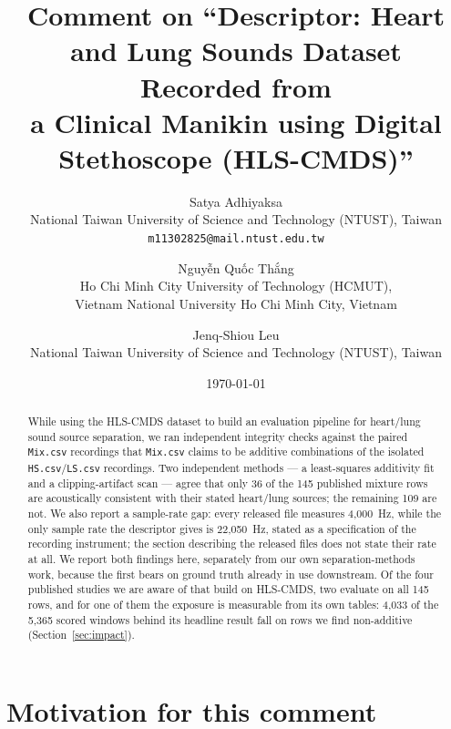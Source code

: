\documentclass[11pt]{article}
\title{Comment on ``Descriptor: Heart and Lung Sounds Dataset Recorded from\\
a Clinical Manikin using Digital Stethoscope (HLS-CMDS)''}
\author{%
  Satya Adhiyaksa\\
  \small National Taiwan University of Science and Technology (NTUST), Taiwan\\
  \small \texttt{m11302825@mail.ntust.edu.tw}
  \and
  Nguyễn Quốc Thắng\\
  \small Ho Chi Minh City University of Technology (HCMUT),\\
  \small Vietnam National University Ho Chi Minh City, Vietnam
  \and
  Jenq-Shiou Leu\\
  \small National Taiwan University of Science and Technology (NTUST), Taiwan}
\date{\today}
\begin{document}
\maketitle

\begin{center}
\end{center}

\begin{abstract}
While using the HLS-CMDS dataset \cite{hlscmds} to build an evaluation
pipeline for heart/lung sound source separation, we ran independent
integrity checks against the paired \texttt{Mix.csv} recordings that
\texttt{Mix.csv} claims to be additive combinations of the isolated
\texttt{HS.csv}/\texttt{LS.csv} recordings. Two independent methods --- a
least-squares additivity fit and a clipping-artifact scan --- agree that
only 36 of the 145 published mixture rows are acoustically consistent with
their stated heart/lung sources; the remaining 109 are not. We also report a
sample-rate gap: every released file measures 4{,}000~Hz, while the only
sample rate the descriptor gives is 22{,}050~Hz, stated as a specification
of the recording instrument; the section describing the released files does
not state their rate at all. We report both findings here, separately from
our own separation-methods work, because the first bears on ground truth
already in use downstream. Of the four published studies we are aware of
that build on HLS-CMDS, two evaluate on all 145 rows, and for one of them
the exposure is measurable from its own tables: 4{,}033 of the 5{,}365
scored windows behind its headline result fall on rows we find
non-additive (Section~\ref{sec:impact}).
\end{abstract}

\section{Motivation for this comment}
\end{document}
